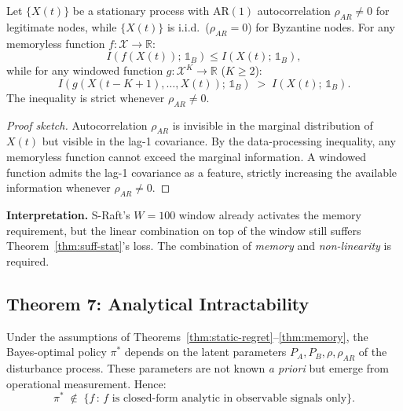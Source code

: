 \begin{theorem}
\label{thm:memory}
Let $\{X(t)\}$ be a stationary process with $\mathrm{AR}(1)$
autocorrelation $\rho_{AR} \neq 0$ for legitimate nodes, while
$\{X(t)\}$ is i.i.d.\ ($\rho_{AR} = 0$) for Byzantine nodes. For any
memoryless function $f : \mathcal{X} \to \mathbb{R}$:
\begin{equation}
  I\!\left(f(X(t));\, \mathbb{1}_B\right) \le I\!\left(X(t);\, \mathbb{1}_B\right),
\end{equation}
while for any windowed function
$g : \mathcal{X}^K \to \mathbb{R}$ ($K \ge 2$):
\begin{equation}
  I\!\left(g(X(t-K+1), \ldots, X(t));\, \mathbb{1}_B\right)
  \;>\; I\!\left(X(t);\, \mathbb{1}_B\right).
\end{equation}
The inequality is strict whenever $\rho_{AR} \neq 0$.
\end{theorem}

\begin{proof}[Proof sketch]
Autocorrelation $\rho_{AR}$ is invisible in the marginal distribution
of $X(t)$ but visible in the lag-1 covariance. By the data-processing
inequality, any memoryless function cannot exceed the marginal
information. A windowed function admits the lag-1 covariance as a
feature, strictly increasing the available information whenever
$\rho_{AR} \neq 0$.
\end{proof}

\textbf{Interpretation.} S-Raft's $W{=}100$ window already activates the
memory requirement, but the linear combination on top of the window
still suffers Theorem~\ref{thm:suff-stat}'s loss. The combination of
\emph{memory} and \emph{non-linearity} is required.

\subsection{Theorem 7: Analytical Intractability}

\begin{theorem}
\label{thm:intractability}
Under the assumptions of
Theorems~\ref{thm:static-regret}--\ref{thm:memory}, the Bayes-optimal
policy $\pi^*$ depends on the latent parameters $P_A, P_B, \rho,
\rho_{AR}$ of the disturbance process. These parameters are not known
\emph{a priori} but emerge from operational measurement. Hence:
\begin{equation}
  \pi^* \;\notin\; \{f \,:\, f \text{ is closed-form analytic in
  observable signals only}\}.
\end{equation}
\end{theorem}

